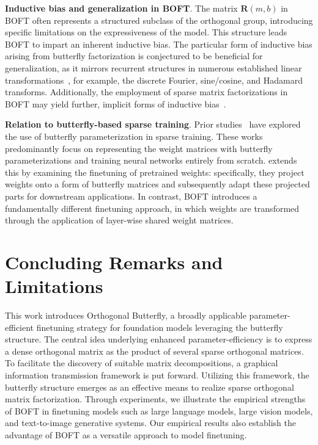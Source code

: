\textbf{Inductive bias and generalization in BOFT}. The matrix $\bm{R}(m,b)$ in BOFT often represents a structured subclass of the orthogonal group, introducing specific limitations on the expressiveness of the model. This structure leads BOFT to impart an inherent inductive bias. The particular form of inductive bias arising from butterfly factorization is conjectured to be beneficial for generalization, as it mirrors recurrent structures in numerous established linear transformations~\cite{dao2019kaleidoscope}, for example, the discrete Fourier, sine/cosine, and Hadamard transforms. Additionally, the employment of sparse matrix factorizations in BOFT may yield further, implicit forms of inductive bias~\cite{gunasekar2017implicit,li2018algorithmic,liu2019neural}.

\textbf{Relation to butterfly-based sparse training}. Prior studies~\cite{dao2019learning,dao2019kaleidoscope,chen2022pixelated,dao2022monarch} have explored the use of butterfly parameterization in sparse training. These works predominantly focus on representing the weight matrices with butterfly parameterizations and training neural networks entirely from scratch. \cite{dao2022monarch} extends this by examining the finetuning of pretrained weights: specifically, they project weights onto a form of butterfly matrices and subsequently adapt these projected parts for downstream applications. In contrast, BOFT introduces a fundamentally different finetuning approach, in which weights are transformed through the application of layer-wise shared weight matrices.



\section{Concluding Remarks and Limitations}

This work introduces Orthogonal Butterfly, a broadly applicable parameter-efficient finetuning strategy for foundation models leveraging the butterfly structure. The central idea underlying enhanced parameter-efficiency is to express a dense orthogonal matrix as the product of several sparse orthogonal matrices. To facilitate the discovery of suitable matrix decompositions, a graphical information transmission framework is put forward. Utilizing this framework, the butterfly structure emerges as an effective means to realize sparse orthogonal matrix factorization. Through experiments, we illustrate the empirical strengths of BOFT in finetuning models such as large language models, large vision models, and text-to-image generative systems. Our empirical results also establish the advantage of BOFT as a versatile approach to model finetuning.

